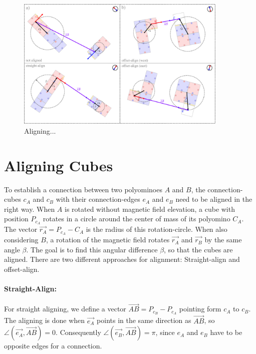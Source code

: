 \begin{figure}
	\centering
	\includegraphics[width=0.90\textwidth]{figures/aligning.pdf}
	\caption{Aligning...}
	\label{fig:aligning}
\end{figure}

\section{Aligning Cubes}
\label{sec:align}

To establish a connection between two polyominoes $A$ and $B$, the connection-cubes $c_A$ and $c_B$ with their connection-edges $e_A$ and $e_B$ need to be aligned in the right way.
When $A$ is rotated without magnetic field elevation, a cube with position $P_{c_A}$ rotates in a circle around the center of mass of its polyomino $C_A$.
The vector $\vec{r_A} = P_{c_A} - C_A$ is the radius of this rotation-circle.
When also considering $B$, a rotation of the magnetic field rotates $\vec{r_A}$ and $\vec{r_B}$ by the same angle $\beta$.
The goal is to find this angular difference $\beta$, so that the cubes are aligned.
There are two different approaches for alignment: Straight-align and offset-align.

\paragraph{Straight-Align:}

For straight aligning, we define a vector $\overrightarrow{AB} = P_{c_B} - P_{c_A}$ pointing form $c_A$ to $c_B$.
The aligning is done when $\vec{e_A}$ points in the same direction as $\overrightarrow{AB}$, so $\angle \left( \vec{e_A}, \overrightarrow{AB} \right) = 0$.
Consequently $\angle \left( \vec{e_B}, \overrightarrow{AB} \right) = \pi$, since $e_A$ and $e_B$ have to be opposite edges for a connection.

